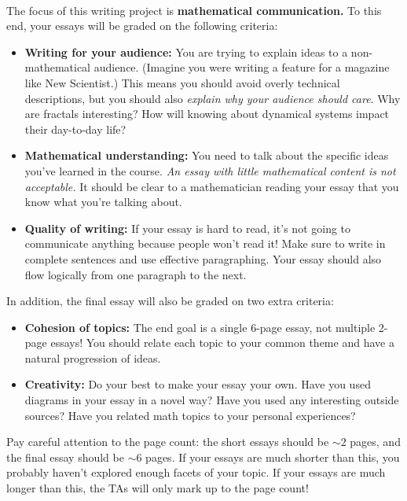 \documentclass[12pt]{article}
\def\mydot{\textcolor{deepblue}{\rule{1ex}{1ex}}}
\newlength\sidebarwidth
\newcommand{\topic}[3][]%
	 {\pagebreak[2]%
	 \vspace{.2cm}
	 \begin{minipage}{\textwidth}
         \phantomsection\addcontentsline{toc}{section}{#1}%
         \nopagebreak\hspace{0in}%
         \nopagebreak\begin{minipage}[t]{\sidebarwidth - .2cm}
         \raggedleft \bf\sc 
	 \color{myblue}{\large #2}
	 \end{minipage}%
	 \hfill
	 \begin{minipage}[t]{\linewidth - \sidebarwidth}
	 \nopagebreak{\color{myblue}%
		    \rule{0pt}{\baselineskip}%
		    \rule{\linewidth}{2.5pt}%
		    \llap{\raisebox{.3\baselineskip}{\sf #1}}%
		    \vspace*{.1\baselineskip}%
		    }%
	 #3%
	 \end{minipage}
	 \end{minipage}}
\newenvironment{mywidth}{\begin{adjustwidth}{\sidebarwidth}{}}{\end{adjustwidth}}
\begin{document}
	\topic{Grading}{~}
	\begin{mywidth}
		The focus of this writing project is \textbf{mathematical communication.} To this end, your essays will be graded on the following criteria:
		\vspace{-.3cm}	
		\begin{itemize}[leftmargin=1cm, itemsep=0ex, parsep=.5ex, labelindent=-4ex, label={\mydot}]
			\item \textbf{Writing for your audience:}
			You are trying to explain ideas 
			to a non-mathematical audience. (Imagine you
			were writing a feature for a magazine like New
			Scientist.) This means you should avoid overly
			technical descriptions, but you should also \textit{explain why your audience should
			care}. Why are fractals interesting? How will
			knowing about dynamical systems impact their
			day-to-day life?

			\item \textbf{Mathematical understanding:}
			You need to talk about the specific ideas you’ve
			learned in the course. \textit{An essay with
			little mathematical content is not acceptable.}
			It should be clear to a mathematician reading your
			essay that you know what you’re talking about.

			\item \textbf{Quality of writing:}
			If your essay is hard to read, it’s not going to
			communicate anything because people won’t read
			it! Make sure to write in complete sentences and
			use effective paragraphing. Your essay should also
			flow logically from one paragraph to the next.

		\end{itemize}
		
		In addition, the final essay will also be graded on two extra criteria:
		\vspace{-.3cm}
		\begin{itemize}[leftmargin=1cm, itemsep=0ex, parsep=.5ex, labelindent=-4ex, label={\mydot}]
			\item \textbf{Cohesion of topics:}
			The end goal is a single 6-page essay, not multiple 
			2-page essays! You should relate each topic to
			your common theme and have a natural progression
			of ideas.

			\item \textbf{Creativity:} %
			Do your best to make your essay your own. Have you
			used diagrams in your essay in a novel way? Have
			you used any interesting outside sources? Have you related
			math topics to your personal experiences?
		\end{itemize}
		
		Pay careful attention to the page count: the short essays
		should be $\sim\!2$ pages, and the final essay should
		be $\sim\!6$ pages. If your essays are much shorter
		than this, you probably haven't explored enough facets
		of your topic. If your essays are much longer than this,
		the TAs will only mark up to the page count!

	\end{mywidth}
\end{document}
